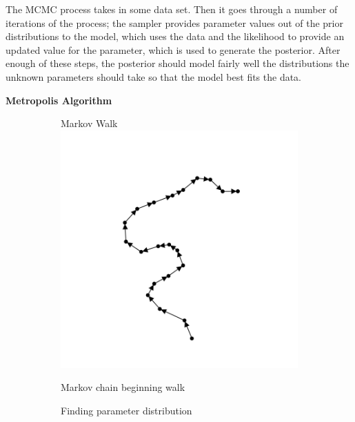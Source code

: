 \documentclass [letterpaper, 12pt] {article}
\begin{document}
The MCMC process takes in some data set. Then it goes through a number of iterations of the process; the sampler provides parameter values out of the prior distributions to the model, which uses the data and the likelihood to provide an updated value for the parameter, which is used to generate the posterior. After enough of these steps, the posterior should model fairly well the distributions the unknown parameters should take so that the model best fits the data.

\newpage

\begin{center}
	\textbf{Metropolis Algorithm}
\end{center}
\begin{figure}[H]
	\begin{subfigure}{0.5\textwidth}
		\centering
		Markov Walk
		\includegraphics[width=\linewidth]{mcmc-start}
		\caption{Markov chain beginning walk}
	\end{subfigure}\hspace{\fill}
	\begin{subfigure}{0.5\textwidth}
		\centering
		Finding parameter distribution

\end{subfigure}
\end{figure}
\end{document}
